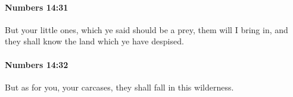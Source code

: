 		\paragraph{Numbers 14:31} %
			\label{NUMBERS-14-31}

			But your little ones, which ye said should be a prey, them will I bring in, and they shall know the land which ye have despised.


		\paragraph{Numbers 14:32} %
			\label{NUMBERS-14-32}

			But as for you, your carcases, they shall fall in this wilderness.


